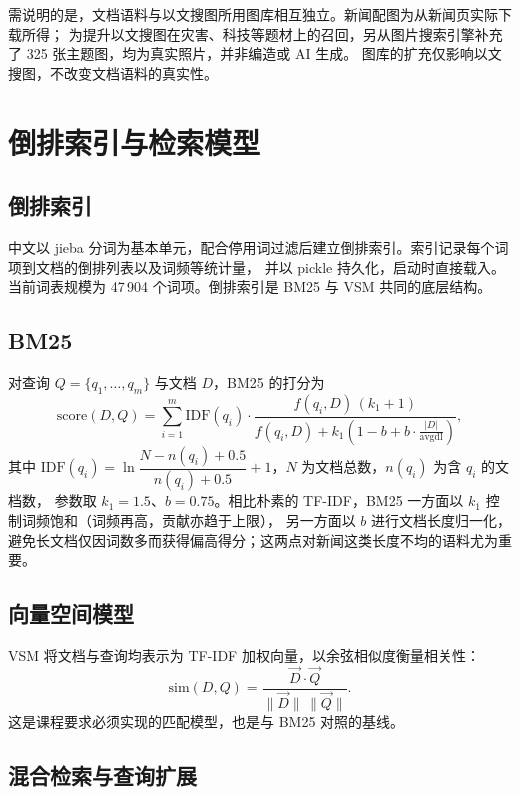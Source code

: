 \documentclass[11pt,a4paper]{ctexart}
\begin{document}
需说明的是，文档语料与以文搜图所用图库相互独立。新闻配图为从新闻页实际下载所得；
为提升以文搜图在灾害、科技等题材上的召回，另从图片搜索引擎补充了 325 张主题图，均为真实照片，并非编造或 AI 生成。
图库的扩充仅影响以文搜图，不改变文档语料的真实性。

\section{倒排索引与检索模型}

\subsection{倒排索引}

中文以 jieba 分词为基本单元，配合停用词过滤后建立倒排索引。索引记录每个词项到文档的倒排列表以及词频等统计量，
并以 pickle 持久化，启动时直接载入。当前词表规模为 47\,904 个词项。倒排索引是 BM25 与 VSM 共同的底层结构。

\subsection{BM25}

对查询 $Q=\{q_1,\dots,q_m\}$ 与文档 $D$，BM25 的打分为
\begin{equation}
\text{score}(D,Q)=\sum_{i=1}^{m}\text{IDF}(q_i)\cdot\frac{f(q_i,D)\,(k_1+1)}{f(q_i,D)+k_1\!\left(1-b+b\cdot\frac{|D|}{\text{avgdl}}\right)},
\end{equation}
其中 $\text{IDF}(q_i)=\ln\dfrac{N-n(q_i)+0.5}{n(q_i)+0.5}+1$，$N$ 为文档总数，$n(q_i)$ 为含 $q_i$ 的文档数，
参数取 $k_1=1.5$、$b=0.75$。相比朴素的 TF-IDF，BM25 一方面以 $k_1$ 控制词频饱和（词频再高，贡献亦趋于上限），
另一方面以 $b$ 进行文档长度归一化，避免长文档仅因词数多而获得偏高得分；这两点对新闻这类长度不均的语料尤为重要。

\subsection{向量空间模型}

VSM 将文档与查询均表示为 TF-IDF 加权向量，以余弦相似度衡量相关性：
\begin{equation}
\text{sim}(D,Q)=\frac{\vec{D}\cdot\vec{Q}}{\lVert\vec{D}\rVert\,\lVert\vec{Q}\rVert}.
\end{equation}
这是课程要求必须实现的匹配模型，也是与 BM25 对照的基线。

\subsection{混合检索与查询扩展}
\end{document}

